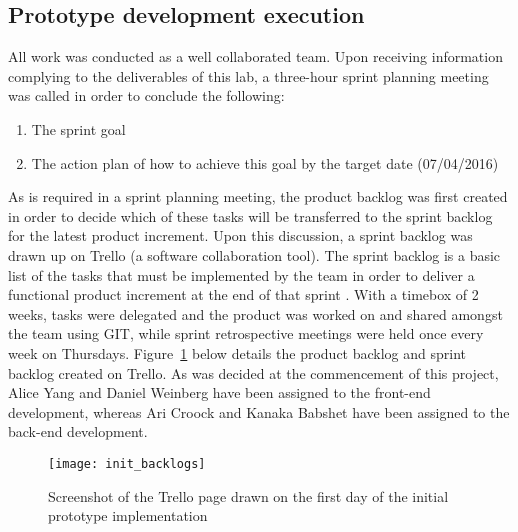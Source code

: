 \documentclass[11pt, a4paper]{article}
\begin{document}
	\subsection{Prototype development execution}
	All work was conducted as a well collaborated team. Upon receiving information complying to the deliverables of this lab, a three-hour sprint planning meeting was called in order to conclude the following: 
	\begin{enumerate}
		\item The sprint goal
		\item The action plan of how to achieve this goal by the target date (07/04/2016)
	\end{enumerate}
	\noindent
	As is required in a sprint planning meeting, the product backlog was first created in order to decide which of these tasks will be transferred to the sprint backlog for the latest product increment. 
	Upon this discussion, a sprint backlog was drawn up on Trello (a software collaboration tool). The sprint backlog is a basic list of the tasks that must be implemented by the team in order to deliver a functional product increment at the end of that sprint \cite{sprintbacklogdef}. 
	\newline
	\newline
	\noindent
	With a timebox of 2 weeks, tasks were delegated and the product was worked on and shared amongst the team using GIT, while sprint retrospective meetings were held once every week on Thursdays. Figure~\ref{fig:init_backlogs} below details the product backlog and sprint backlog created on Trello.
	\newline
	\newline
	\noindent	
	As was decided at the commencement of this project, Alice Yang and Daniel Weinberg have been assigned to the front-end development, whereas Ari Croock and Kanaka Babshet have been assigned to the back-end development. 
	\newline
	
	\begin{figure}[htb]
		\centering
		\texttt{[image: init\_backlogs]}
		\caption{Screenshot of the Trello page drawn on the first day of the initial prototype implementation}
		\label{fig:init_backlogs}
	\end{figure}
\end{document}
